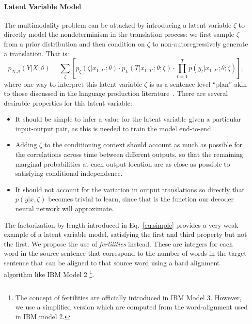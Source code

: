 \paragraph{Latent Variable Model}
The multimodality problem can be attacked by introducing a latent variable $\zeta$ to directly model the nondeterminism in the translation process: we first sample $\zeta$ from a prior distribution and then condition on $\zeta$ to non-autoregressively generate a translation. That is:
 \begin{equation}
 \label{cp8.eq.latent}
 p_{\mathcal{NA}}(Y|X; \theta) = \sum_\zeta{\left[p_\zeta(\zeta|x_{1:T'};\theta)\cdot p_L(T|x_{1:T'};\theta;\zeta)\cdot \prod_{t=1}^T p(y_t| x_{1:T'};\theta;\zeta)\right]},
 \end{equation}
 where one way to interpret this latent variable $\zeta$  is as a sentence-level ``plan'' akin to those discussed in the language production literature~\citep{martin2010planning}. There are several desirable properties for this latent variable:
\begin{itemize}
\item It should be simple to infer a value for the latent variable given a particular input-output pair, as this is needed to train the model end-to-end.
\item Adding $\zeta$ to the conditioning context should account as much as possible for the correlations across time between different outputs, so that the remaining marginal probabilities at each output location are as close as possible to satisfying conditional independence.
\item It should not account for the variation in output translations so directly that $p(y|x, \zeta)$ becomes trivial to learn, since that is the function our decoder neural network will approximate.
\end{itemize}
The factorization by length introduced in Eq.~\eqref{eq.simple} provides a very weak example of a latent variable model, satisfying the first and third property but not the first. We propose the use of \emph{fertilities} instead. These are integers for each word in the source sentence that correspond to the number of words in the target sentence that can be aligned to that source word using a hard alignment algorithm like IBM Model 2 \citep{brown1993mathematics}\footnote{The concept of fertilities are officially introduced in IBM Model 3. However, we use a simplified version which are computed from the word-alignment used in IBM model 2.}.


